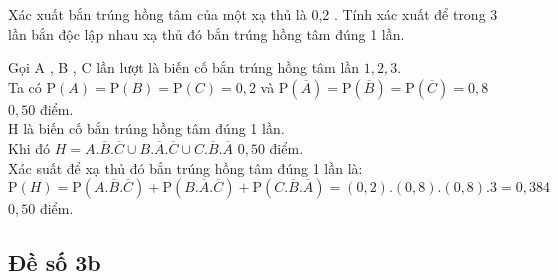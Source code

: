 \begin{bt}[1,5 điểm]%
	Xác xuất bắn trúng hồng tâm của một xạ thủ là 0,2 . Tính xác xuất để trong 3 lần bắn độc lập nhau xạ thủ đó bắn trúng hồng tâm đúng 1 lần.
	\loigiai
	{Gọi A , B , C lần lượt là biến cố bắn trúng hồng tâm lần $1,2,3$.\\
		Ta có $\mathrm{P}(A)=\mathrm{P}(B)=\mathrm{P}(C)=0,2$ và $\mathrm{P}( \overline A) = \mathrm{P}( \overline B)=\mathrm{P}( \overline C)=0,8$ \dotfill $0,50$ điểm.\\
		H là biến cố bắn trúng hồng tâm đúng 1 lần. \\
		Khi đó $H=A.\overline B. \overline C \cup B. \overline A. \overline C \cup C. \overline B. \overline A $ \dotfill $0,50$ điểm.\\
		Xác suất để xạ thủ đó bắn trúng hồng tâm đúng 1 lần là:\\
		$\mathrm{P}(H)=\mathrm{P}(A.\overline{B}.\overline{C})+\mathrm{P}(B.\overline{A}.\overline{C})+\mathrm{P}(C.\overline{B}.\overline{A})=(0,2).(0,8).(0,8).3=0,384$ \dotfill $0,50$ điểm.
		
	}
\end{bt}

\subsection{Đề số 3b}
\setcounter{bt}{0}

